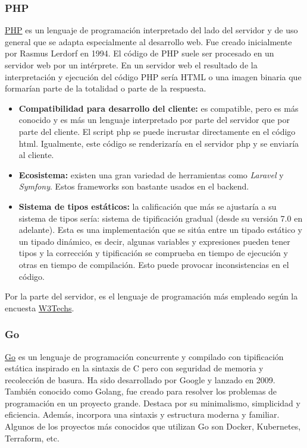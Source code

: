 \subsubsection{\MakeUppercase{Php}}

\href{https://es.wikipedia.org/w/index.php?title=PHP&oldid=161463562}{PHP} es un lenguaje de programación interpretado del lado del servidor y de uso general que se adapta especialmente al desarrollo web. Fue creado inicialmente por Rasmus Lerdorf en 1994. El código de PHP suele ser procesado en un servidor web por un intérprete. En un servidor web el resultado de la interpretación y ejecución del código PHP sería HTML o una imagen binaria que formarían parte de la totalidad o parte de la respuesta.

\begin{itemize}
    \item[\mal] \textbf{Compatibilidad para desarrollo del cliente:} es compatible, pero es más conocido y es más un lenguaje interpretado por parte del servidor que por parte del cliente. El script php se puede incrustar directamente en el código html. Igualmente, este código se renderizaría en el servidor php y se enviaría al cliente.
    \item[\bien] \textbf{Ecosistema:} existen una gran variedad de herramientas como \textit{Laravel} y \textit{Symfony}. Estos frameworks son bastante usados en el backend.
    \item[\bien] \textbf{Sistema de tipos estáticos:} la calificación que más se ajustaría a su sistema de tipos sería: sistema de tipificación gradual (desde su versión 7.0 en adelante). Esta es una implementación que se sitúa entre un tipado estático y un tipado dinámico, es decir, algunas variables y expresiones pueden tener tipos y la corrección y tipificación se comprueba en tiempo de ejecución y otras en tiempo de compilación. Esto puede provocar inconsistencias en el código.
\end{itemize}

Por la parte del servidor, es el lenguaje de programación más empleado según la encuesta \href{https://w3techs.com/technologies/overview/programming_language}{W3Techs}.

\subsubsection{Go}

\href{https://es.wikipedia.org/w/index.php?title=Go_(lenguaje_de_programaci%C3%B3n)&oldid=158783243}{Go} es un lenguaje de programación concurrente y compilado con tipificación estática inspirado en la sintaxis de C pero con seguridad de memoria y recolección de basura. Ha sido desarrollado por Google y lanzado en 2009. También conocido como Golang, fue creado para resolver los problemas de programación en un proyecto grande. Destaca por su minimalismo, simplicidad y eficiencia. Además, incorpora una sintaxis y estructura moderna y familiar. Algunos de los proyectos más conocidos que utilizan Go son Docker, Kubernetes, Terraform, etc.

